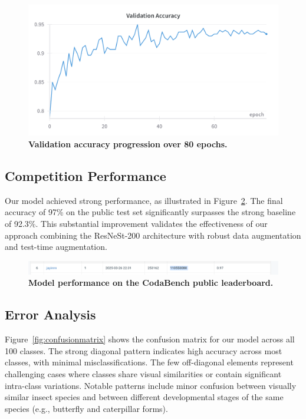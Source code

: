 \documentclass[twocolumn,a4paper]{article}
\begin{document}
\begin{figure}[H]
\centering
\includegraphics[width=0.95\linewidth]{figs/val_acc}
\caption{\textbf{Validation accuracy progression over 80 epochs.}}
\label{fig:valacc}
\end{figure}

\subsection{Competition Performance}

Our model achieved strong performance, as illustrated in Figure~\ref{fig:publicscore}. The final accuracy of 97\% on the public test set significantly surpasses the strong baseline of 92.3\%. This substantial improvement validates the effectiveness of our approach combining the ResNeSt-200 architecture with robust data augmentation and test-time augmentation.

\begin{figure}[H]
\centering
\includegraphics[width=0.95\linewidth]{figs/public_score}
\caption{\textbf{Model performance on the CodaBench public leaderboard.}}
\label{fig:publicscore}
\end{figure}

\subsection{Error Analysis}

Figure~\ref{fig:confusionmatrix} shows the confusion matrix for our model across all 100 classes. The strong diagonal pattern indicates high accuracy across most classes, with minimal misclassifications. The few off-diagonal elements represent challenging cases where classes share visual similarities or contain significant intra-class variations. Notable patterns include minor confusion between visually similar insect species and between different developmental stages of the same species (e.g., butterfly and caterpillar forms).
\end{document}
